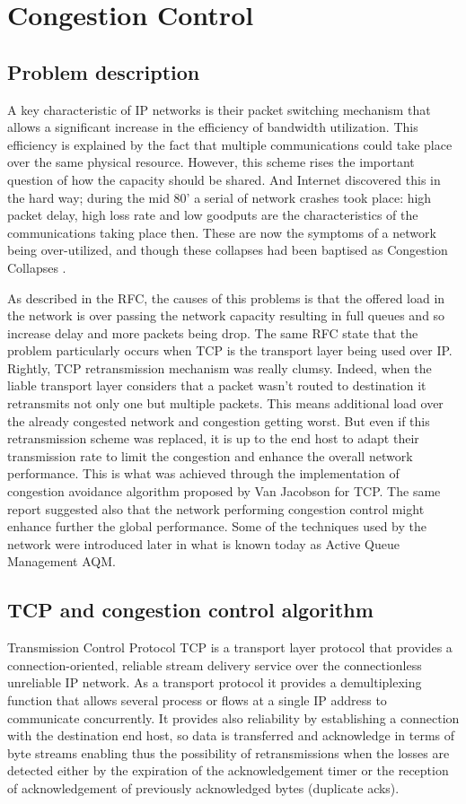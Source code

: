 \section{Congestion Control}

\subsection{Problem description}
A key characteristic of IP networks is their packet switching mechanism that allows a significant increase in the efficiency of bandwidth utilization. This efficiency is explained by the fact that multiple communications could take place over the same physical resource. However, this scheme rises the important question of how the capacity should be shared. And Internet discovered this in the hard way; during the mid 80' a serial of network crashes took place: high packet delay, high loss rate and  low  goodputs are the characteristics of the communications taking place then. These are now the symptoms of a network being over-utilized, and though these collapses had been baptised as Congestion Collapses \cite{RFC896}. 

As described in the RFC, the causes of this problems is that the offered load in the network is over passing the network capacity resulting in full queues and so increase delay and more packets being drop. The same RFC state that the problem particularly occurs when TCP is the transport layer being used over IP. Rightly, TCP retransmission mechanism was really clumsy. Indeed, when the liable transport layer considers that a packet wasn't routed to destination it retransmits not only one but multiple packets. This means additional load over the already congested network and congestion getting worst. But even if this retransmission scheme was replaced, it is up to the end host to adapt their transmission rate to limit the congestion and enhance the overall network performance. This is what was achieved through the implementation of congestion avoidance algorithm proposed by Van Jacobson \cite{Jacobson88} for TCP. The same report suggested also that the network performing congestion control might enhance further the global performance. Some of the techniques used by the network were introduced later in what is known today as Active Queue Management AQM.

\subsection{TCP and congestion control algorithm}
Transmission Control Protocol TCP is a transport layer protocol that provides a connection-oriented, reliable stream delivery service over the connectionless unreliable IP network. As a transport protocol it provides a demultiplexing function that allows several process or flows at a single IP address to communicate concurrently. It provides also reliability by establishing a connection with the destination end host, so data is transferred and acknowledge in terms of byte streams enabling thus the possibility of retransmissions when the losses are detected either by the expiration of the acknowledgement timer or the reception of acknowledgement of previously acknowledged bytes (duplicate acks).

